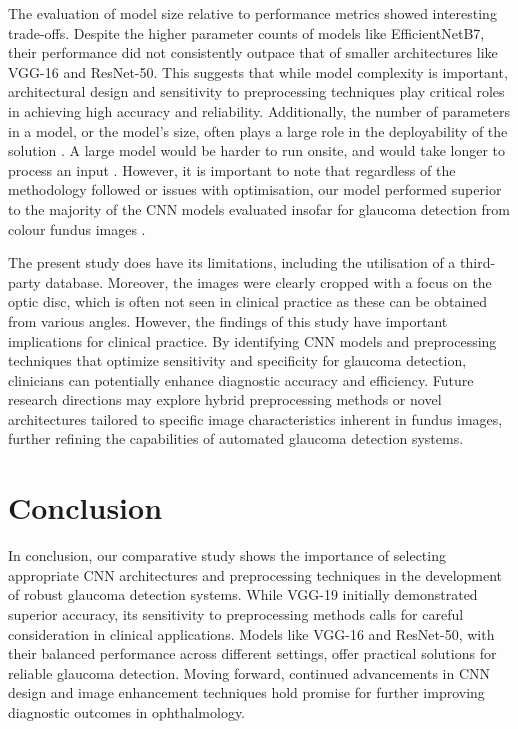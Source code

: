\documentclass{article}
\begin{document}
The evaluation of model size relative to performance metrics showed interesting trade-offs. Despite the higher parameter counts of models like EfficientNetB7, their performance did not consistently outpace that of smaller architectures like VGG-16 and ResNet-50. This suggests that while model complexity is important, architectural design and sensitivity to preprocessing techniques play critical roles in achieving high accuracy and reliability. Additionally, the number of parameters in a model, or the model’s size, often plays a large role in the deployability of the solution \cite{b33}. A large model would be harder to run onsite, and would take longer to process an input \cite{b34}. However, it is important to note that regardless of the methodology followed or issues with optimisation, our model performed superior to the majority of the CNN models evaluated insofar for glaucoma detection from colour fundus images \cite{b35}.

The present study does have its limitations, including the utilisation of a third-party database. Moreover, the images were clearly cropped with a focus on the optic disc, which is often not seen in clinical practice as these can be obtained from various angles. However, the findings of this study have important implications for clinical practice. By identifying CNN models and preprocessing techniques that optimize sensitivity and specificity for glaucoma detection, clinicians can potentially enhance diagnostic accuracy and efficiency. Future research directions may explore hybrid preprocessing methods or novel architectures tailored to specific image characteristics inherent in fundus images, further refining the capabilities of automated glaucoma detection systems.

\section{Conclusion}
In conclusion, our comparative study shows the importance of selecting appropriate CNN architectures and preprocessing techniques in the development of robust glaucoma detection systems. While VGG-19 initially demonstrated superior accuracy, its sensitivity to preprocessing methods calls for careful consideration in clinical applications. Models like VGG-16 and ResNet-50, with their balanced performance across different settings, offer practical solutions for reliable glaucoma detection. Moving forward, continued advancements in CNN design and image enhancement techniques hold promise for further improving diagnostic outcomes in ophthalmology.
\end{document}
